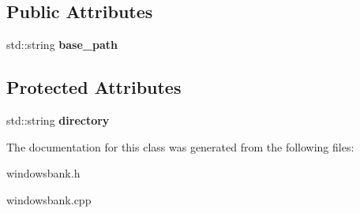 \subsection*{Public Attributes}
\begin{DoxyCompactItemize}
\item 
\hypertarget{classg2c_1_1_windows_bank_ad377e1d8151bd0523db1e600603c3ffe}{
std::string {\bfseries base\_\-path}}
\label{classg2c_1_1_windows_bank_ad377e1d8151bd0523db1e600603c3ffe}

\end{DoxyCompactItemize}
\subsection*{Protected Attributes}
\begin{DoxyCompactItemize}
\item 
\hypertarget{classg2c_1_1_windows_bank_a326056cc86dbdd94bf9e8fd4f377390a}{
std::string {\bfseries directory}}
\label{classg2c_1_1_windows_bank_a326056cc86dbdd94bf9e8fd4f377390a}

\end{DoxyCompactItemize}


The documentation for this class was generated from the following files:\begin{DoxyCompactItemize}
\item 
windowsbank.h\item 
windowsbank.cpp\end{DoxyCompactItemize}
